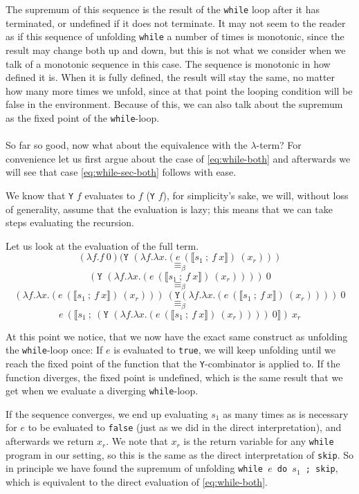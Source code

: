 \documentclass[11pt, leqno, titlepage]{article}
\theoremstyle{definition}
\begin{document}
The supremum of this sequence is the result of the \texttt{while} loop after it has
terminated, or undefined if it does not terminate. It may not seem to the reader as
if this sequence of unfolding \texttt{while} a number of times is monotonic, since
the result may change both up and down, but this is not what we consider when we talk
of a monotonic sequence in this case. The sequence is monotonic in how defined it
is. When it is fully defined, the result will stay the same, no matter how many more
times we unfold, since at that point the looping condition will be false in the
environment. Because of this, we can also talk about the supremum as the fixed point
of the \texttt{while}-loop.\\
\\
So far so good, now what about the equivalence with the $\lambda$-term?
For convenience let us first argue about the case of \ref{eq:while-both} and
afterwards we will see that case \ref{eq:while-sec-both} follows with ease.

We know that \texttt{Y} $f$ evaluates to $f$ (\texttt{Y} $f$), for simplicity's sake,
we will, without loss of generality, assume that the evaluation is lazy; this means
that we can take steps evaluating the recursion.

Let us look at the evaluation of the full term.
$$(\lambda f. f~0) (\texttt{Y }(\lambda f.\lambda x.(e~(\llbracket
s_1~;~f~x\rrbracket) ~(x_r)))$$ 
$$\equiv_\beta$$
$$(\texttt{Y }(\lambda f.\lambda x.(e~(\llbracket s_1~;~f~x\rrbracket) ~(x_r))))~ 0 $$
$$\equiv_\beta$$
$$(\lambda f.\lambda x.(e~(\llbracket s_1~;~f~x\rrbracket) ~(x_r)))~(\texttt{Y
}(\lambda f.\lambda x.(e~(\llbracket s_1~;~f~x\rrbracket) ~(x_r))))~ 0 $$ 
$$\equiv_\beta$$
$$e~(\llbracket s_1~;~(\texttt{Y }(\lambda f.\lambda x.(e~(\llbracket
s_1~;~f~x\rrbracket) ~(x_r))))~0 \rrbracket) ~x_r $$

At this point we notice, that we now have the exact same construct as unfolding the
\texttt{while}-loop once: If $e$ is evaluated to \texttt{true}, we will keep
unfolding until we reach the fixed point of the function that the
\texttt{Y}-combinator is applied to. If the function diverges, the fixed point is
undefined, which is the same result that we get when we evaluate a diverging
\texttt{while}-loop.

If the sequence converges, we end up evaluating $s_1$ as many times as is necessary
for $e$ to be evaluated to \texttt{false} (just as we did in the direct
interpretation), and afterwards we return $x_r$. We note that $x_r$ is the return
variable for any \texttt{while} program in our setting, so this is the same as the
direct interpretation of \texttt{skip}. So in principle we have found the supremum of
unfolding \texttt{while $e$ do $s_1$ ; skip}, which is equivalent to the direct
evaluation of \ref{eq:while-both}.
\end{document}
